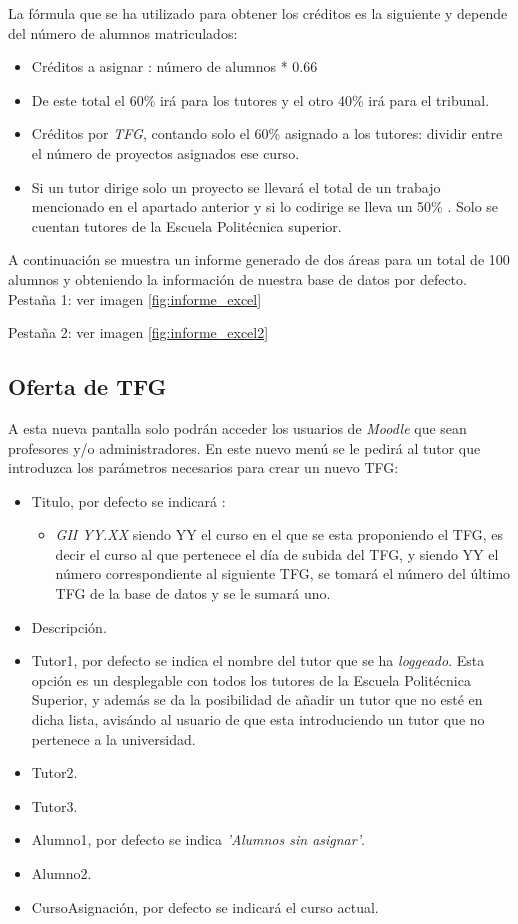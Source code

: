La fórmula que se ha utilizado para obtener los créditos es la siguiente y depende del número de alumnos matriculados:
\begin{itemize}
	\item Créditos a asignar : número de alumnos * 0.66
	\item De este total el 60\% irá para los tutores y el otro 40\% irá para el tribunal.
	\item Créditos por \emph{TFG}, contando solo el 60\% asignado a los tutores: dividir entre el número de proyectos asignados ese curso.
	\item Si un tutor dirige solo un proyecto se llevará el total de un trabajo mencionado en el apartado anterior y si lo codirige se lleva un 50\% . Solo se cuentan tutores de la Escuela Politécnica superior.
\end{itemize}
A continuación se muestra un informe generado de dos áreas para un total de 100 alumnos y obteniendo la información de nuestra base de datos por defecto.
Pestaña 1: ver imagen \ref{fig:informe_excel}

Pestaña 2: ver imagen \ref{fig:informe_excel2}

\subsection{Oferta de TFG}

A esta nueva pantalla solo podrán acceder los usuarios de \emph{Moodle} que sean profesores y/o administradores.
En este nuevo menú se le pedirá al tutor que introduzca los parámetros necesarios para crear un nuevo TFG:

\begin{itemize}
	\item Titulo, por defecto se indicará :
	\begin{itemize}
		\item \emph{GII YY.XX} siendo YY el curso en el que se esta proponiendo el TFG, es decir el curso al que pertenece el día de subida del TFG, y siendo YY el número correspondiente al siguiente TFG, se tomará el número del último TFG de la base de datos y se le sumará uno.
	\end{itemize}
	\item Descripción.
	\item Tutor1, por defecto se indica el nombre del tutor que se ha \emph{loggeado}. Esta opción es un desplegable con todos los tutores de la Escuela Politécnica Superior, y además se da la posibilidad de añadir un tutor que no esté en dicha lista, avisándo al usuario de que esta introduciendo un tutor que no pertenece a la universidad.
	\item Tutor2.
	\item Tutor3.
	\item Alumno1, por defecto se indica \emph{'Alumnos sin asignar'}.
	\item Alumno2.
	\item CursoAsignación, por defecto se indicará el curso actual.
\end{itemize}

